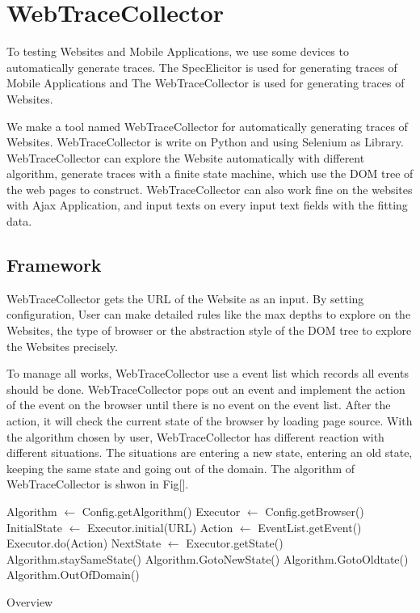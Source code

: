 
\chapter{WebTraceCollector}\label{ch:traceCollector}

To testing Websites and Mobile Applications, 
we use some devices to automatically generate traces.
The SpecElicitor is used for generating traces of Mobile Applications
and The WebTraceCollector is used for generating traces of Websites.

We make a tool named WebTraceCollector for automatically generating traces of Websites.
WebTraceCollector is write on Python and using Selenium as Library.
WebTraceCollector can explore the Website automatically with different algorithm,
generate traces with a finite state machine, which use the DOM tree of the web pages to construct.
WebTraceCollector can also work fine on the websites with Ajax Application,
and input texts on every input text fields with the fitting data.


\section{Framework}

WebTraceCollector gets the URL of the Website as an input.
By setting configuration, User can make detailed rules like the max depths to explore on the Websites, the type of browser or the abstraction style of the DOM tree to explore the Websites precisely.

To manage all works, WebTraceCollector use a event list which records all events should be done.
WebTraceCollector pops out an event and implement the action of the event on the browser until there is no event on the event list.
After the action, it will check the current state of the browser by loading page source.
With the algorithm chosen by user, WebTraceCollector has different reaction with different situations.
The situations are entering a new state, entering an old state, keeping the same state and going out of the domain.
The algorithm of WebTraceCollector is shwon in Fig[].

\begin{algorithm}[htb]
	\begin{doublespace}		
		Algorithm $\gets$ Config.getAlgorithm()\;
		Executor $\gets$ Config.getBrowser()\;
		InitialState $\gets$ Executor.initial(URL)\;
		{
			Action $\gets$ EventList.getEvent()\;
			Executor.do(Action)\;
			NextState $\gets$ Executor.getState()\;
			{
				{ Algorithm.staySameState() }
				{ Algorithm.GotoNewState() }
				{ Algorithm.GotoOldtate() }
				{ Algorithm.OutOfDomain() }
			}			
		}		
	\end{doublespace}
	\caption{Overview}
	\label{algorithm:overview}
\end{algorithm} 

